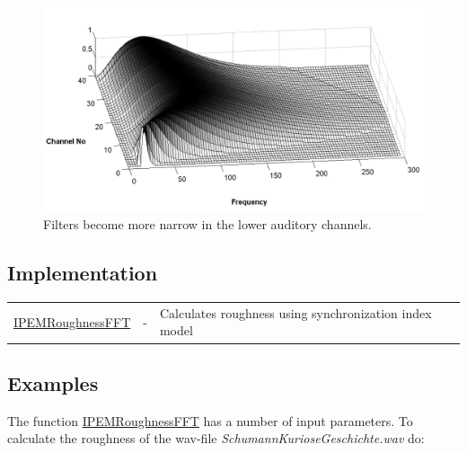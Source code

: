 \begin{figure}[ht]
    \centering
    \includegraphics[width=\IPEMDefaultFigureWidth]{Graphics/Filters}
    \caption{Filters become more narrow in the lower auditory channels.}
    \label{Fig:Filters}
\end{figure}




\subsection{Implementation}

\begin{tabularx}{\linewidth}{llX}
\hyperlink{FuncRef:IPEMRoughnessFFT}{IPEMRoughnessFFT} & - & Calculates roughness using synchronization index model\\
\end{tabularx}


\subsection{Examples}

The function
\hyperlink{FuncRef:IPEMRoughnessFFT}{IPEMRoughnessFFT}
has a number of input parameters. To calculate the roughness of
the wav-file \emph{SchumannKurioseGeschichte.wav} do:\\

\\

